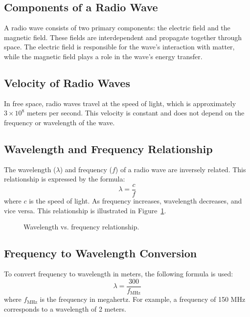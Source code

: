 \subsection*{Components of a Radio Wave}
A radio wave consists of two primary components: the electric field and the magnetic field. These fields are interdependent and propagate together through space. The electric field is responsible for the wave's interaction with matter, while the magnetic field plays a role in the wave's energy transfer.

\subsection*{Velocity of Radio Waves}
In free space, radio waves travel at the speed of light, which is approximately $3 \times 10^8$ meters per second. This velocity is constant and does not depend on the frequency or wavelength of the wave.

\subsection*{Wavelength and Frequency Relationship}
The wavelength ($\lambda$) and frequency ($f$) of a radio wave are inversely related. This relationship is expressed by the formula:
\begin{equation}
    \lambda = \frac{c}{f}
    \label{eq:wavelength_frequency}
\end{equation}
where $c$ is the speed of light. As frequency increases, wavelength decreases, and vice versa. This relationship is illustrated in Figure~\ref{fig:wavelength_frequency}.

\begin{figure}[h!]
    \centering
    \caption{Wavelength vs. frequency relationship.}
    \label{fig:wavelength_frequency}
\end{figure}

\subsection*{Frequency to Wavelength Conversion}
To convert frequency to wavelength in meters, the following formula is used:
\begin{equation}
    \lambda = \frac{300}{f_{\text{MHz}}}
    \label{eq:frequency_wavelength}
\end{equation}
where $f_{\text{MHz}}$ is the frequency in megahertz. For example, a frequency of 150 MHz corresponds to a wavelength of 2 meters.

